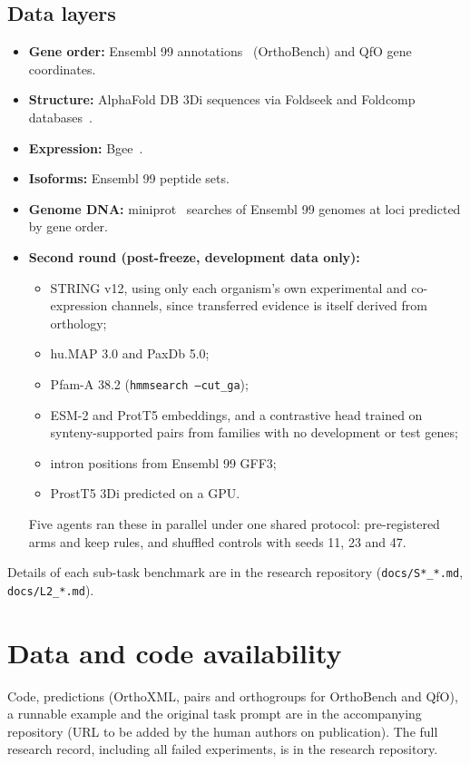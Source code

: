 \documentclass[10pt,letterpaper]{article}
\begin{document}
\subsection*{Data layers}
\begin{itemize}
\item \textbf{Gene order:} Ensembl 99 annotations~\cite{yates2019ensembl} (OrthoBench) and QfO gene coordinates.
\item \textbf{Structure:} AlphaFold DB 3Di sequences via Foldseek and Foldcomp databases~\cite{vankempen2024foldseek,kim2023foldcomp,varadi2024alphafolddb}.
\item \textbf{Expression:} Bgee~\cite{bastian2025bgee}.
\item \textbf{Isoforms:} Ensembl 99 peptide sets.
\item \textbf{Genome DNA:} miniprot~\cite{li2023miniprot} searches of Ensembl 99 genomes at loci predicted by gene order.
\item \textbf{Second round (post-freeze, development data only):}
  \begin{itemize}
  \item STRING v12, using only each organism's own experimental and co-expression channels, since transferred evidence is itself derived from orthology;
  \item hu.MAP 3.0 and PaxDb 5.0;
  \item Pfam-A 38.2 (\texttt{hmmsearch --cut\_ga});
  \item ESM-2 and ProtT5 embeddings, and a contrastive head trained on synteny-supported pairs from families with no development or test genes;
  \item intron positions from Ensembl 99 GFF3;
  \item ProstT5 3Di predicted on a GPU.
  \end{itemize}
  Five agents ran these in parallel under one shared protocol: pre-registered arms and keep rules, and shuffled controls with seeds 11, 23 and 47.
\end{itemize}
Details of each sub-task benchmark are in the research repository (\texttt{docs/S*\_*.md}, \texttt{docs/L2\_*.md}).

\section*{Data and code availability}
Code, predictions (OrthoXML, pairs and orthogroups for OrthoBench and QfO), a runnable example and the original task prompt are in the accompanying repository (URL to be added by the human authors on publication). The full research record, including all failed experiments, is in the research repository.
\end{document}
